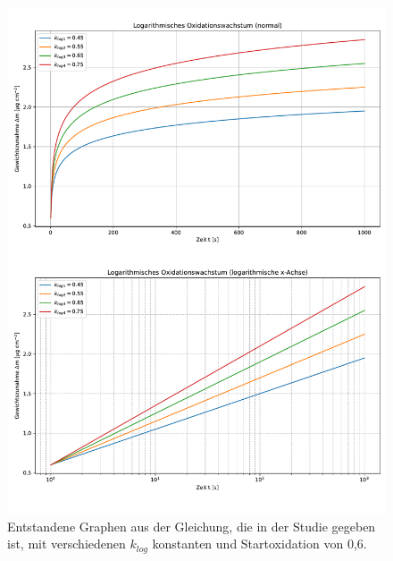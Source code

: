 \begin{figure}
    \includegraphics[width=\textwidth, page=1]{img/21/Plots_oxi.pdf}
    \caption{Entstandene Graphen aus der Gleichung, die in der Studie gegeben ist, mit verschiedenen $k_{log}$ konstanten und Startoxidation von 0,6.}
    \label{fig:log_3}
\end{figure}
\twocolumn